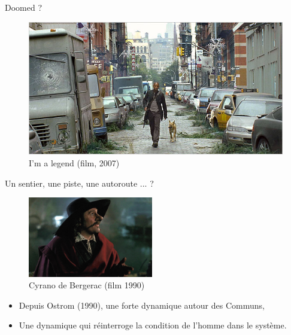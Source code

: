 \documentclass[newPxFont]{beamer}
\begin{document}
\begin{frame}[c]{Doomed ?}
\vspace{-1cm}

\begin{figure}
  \includegraphics[width=\textwidth]{img/im_legend-600.jpg}
  \caption{I'm a legend (film, 2007)}
\end{figure}
\end{frame}

\begin{frame}[c]{Un sentier, une piste, une autoroute ... ?}
\vspace{-1cm}
\begin{figure}
  \includegraphics[height=3.5cm]{img/cyrano.jpg}
  \caption{Cyrano de Bergerac (film 1990)}
\end{figure}
\begin{itemize}
  \item Depuis Ostrom (1990), une forte dynamique autour des Communs,
  \item Une dynamique qui réinterroge la condition de l’homme dans le système.
\end{itemize}
\end{frame}
\end{document}
